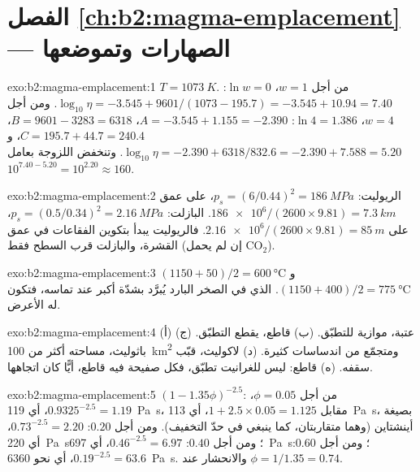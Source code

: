 \section*{الفصل \ref{ch:b2:magma-emplacement} --- الصهارات وتموضعها}

\begin{solution}{exo:b2:magma-emplacement:1}
$T = \qty{1073}{K}$. من أجل $w = 1$، $\ln w = 0$: $\log_{10}\eta = -3.545 +
9601/(1073 - 195.7) = -3.545 + 10.94 = 7.40$. ومن أجل $w = 4$، $\ln 4 = 1.386$:
$A = -3.545 + 1.155 = -2.390$، $B = 9601 - 3283 = 6318$، $C = 195.7 + 44.7 =
240.4$، و$\log_{10}\eta = -2.390 + 6318/832.6 = -2.390 + 7.588 = 5.20$.
وتنخفض اللزوجة بعامل $10^{7.40 - 5.20} = 10^{2.20} \approx 160$.
\end{solution}

\begin{solution}{exo:b2:magma-emplacement:2}
الريوليت: $p_s = (6/0.44)^2 = \qty{186}{MPa}$، على عمق $\num{186e6}/(2600\times9.81)
= \qty{7.3}{km}$. البازلت: $p_s = (0.5/0.34)^2 = \qty{2.16}{MPa}$، على
$\num{2.16e6}/(2600\times9.81) = \qty{85}{m}$. فالريوليت يبدأ بتكوين الفقاعات
في عمق القشرة، والبازلت قرب السطح فقط (إن لم يحمل CO$_2$).
\end{solution}

\begin{solution}{exo:b2:magma-emplacement:3}
$(1150 + 50)/2 = \qty{600}{\celsius}$ و$(1150 + 400)/2 = \qty{775}{\celsius}$.
 الذي في الصخر البارد يُبرَّد بشدّة أكبر عند تماسه، فتكون له
 الأعرض.
\end{solution}

\begin{solution}{exo:b2:magma-emplacement:4}
(أ) عتبة، موازية للتطبّق. (ب) قاطع، يقطع التطبّق.
(ج) باثوليث، مساحته أكثر من \qty{100}{km^2} ومتجمّع من اندساسات كثيرة.
(د) لاكوليث، قبّب سقفه. (ه) قاطع: ليس للغرانيت تطبّق،
فكل صفيحة فيه قاطع، أيًّا كان اتجاهها.
\end{solution}

\begin{solution}{exo:b2:magma-emplacement:5}
$(1 - 1.35\phi)^{-2.5}$: من أجل $\phi = 0.05$، $0.9325^{-2.5} = 1.19$، أي
\qty{119}{Pa.s}، مقابل $1 + 2.5\times0.05 = 1.125$، أي \qty{113}{Pa.s}، بصيغة
أينشتاين (وهما متقاربتان، كما ينبغي في حدّ التخفيف). ومن أجل $0.20$: $0.73^{-2.5} =
2.20$، أي \qty{220}{Pa.s}؛ ومن أجل $0.40$: $0.46^{-2.5} = 6.97$، أي \qty{697}{Pa.s}؛ ومن أجل $0.60$:
$0.19^{-2.5} = 63.6$، أي نحو \qty{6360}{Pa.s}. والانحشار عند $\phi = 1/1.35 = 0.74$.
\end{solution}

